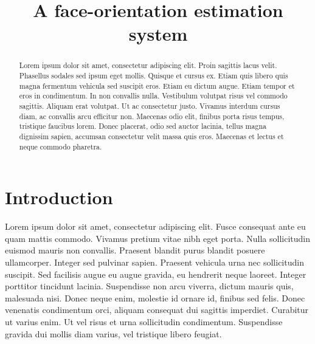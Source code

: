 \documentclass[a4paper]{article}
\title{A face-orientation estimation system}
\begin{document}
\maketitle

%
%

\begin{abstract}

   Lorem ipsum dolor sit amet, consectetur adipiscing elit. Proin sagittis lacus velit. Phasellus sodales sed ipsum eget mollis. Quisque et cursus ex. Etiam quis libero quis magna fermentum vehicula sed suscipit eros. Etiam eu dictum augue. Etiam tempor et eros in condimentum. In non convallis nulla. Vestibulum volutpat risus vel commodo sagittis. Aliquam erat volutpat. Ut ac consectetur justo. Vivamus interdum cursus diam, ac convallis arcu efficitur non. Maecenas odio elit, finibus porta risus tempus, tristique faucibus lorem. Donec placerat, odio sed auctor lacinia, tellus magna dignissim sapien, accumsan consectetur velit massa quis eros. Maecenas et lectus et neque commodo pharetra.

\end{abstract}

\section{Introduction}


Lorem ipsum dolor sit amet, consectetur adipiscing elit. Fusce consequat ante eu quam mattis commodo. Vivamus pretium vitae nibh eget porta. Nulla sollicitudin euismod mauris non convallis. Praesent blandit purus blandit posuere ullamcorper. Integer sed pulvinar sapien. Praesent vehicula urna nec sollicitudin suscipit. Sed facilisis augue eu augue gravida, eu hendrerit neque laoreet. Integer porttitor tincidunt lacinia. Suspendisse non arcu viverra, dictum mauris quis, malesuada nisi. Donec neque enim, molestie id ornare id, finibus sed felis. Donec venenatis condimentum orci, aliquam consequat dui sagittis imperdiet. Curabitur ut varius enim. Ut vel risus et urna sollicitudin condimentum. Suspendisse gravida dui mollis diam varius, vel tristique libero feugiat.
\end{document}

